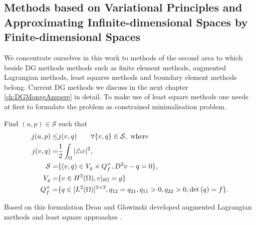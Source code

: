 \subsection{Methods based on Variational Principles and Approximating Infinite-dimensional Spaces by Finite-dimensional Spaces}
 We concentrate ourselves in this work to methods of the second area to which beside DG methods methods such as finite element methods, augmented Lagrangian methods, least squares methods and boundary element methods belong. Current DG methods we discuss in the next chapter \ref{ch:DGMongeAmpere} in detail.
To make use of least square methods one needs at first to formulate the \MA problem as constrained minimalisation problem.
\begin{definition}
Find $(u,p) \in \mathcal{S}$ such that
\begin{align}
	j(u,p) \leq& j(v,q) \qquad \forall \{v,q\} \in \mathcal{S}, \text{ where }\\
	j(v,q)  =& \frac 1 2 \int_{\Omega} |\triangle v |^2, \\
	\mathcal{S} =& \{(v,q)\in V_g \times Q^+_f, D^2v-q =0\},\\
	V_g =& \{v \in H^2(\Omega), v \arrowvert_{\delta \Omega}=g\} \\
	Q^+_f =& \{q \in [L^2(\Omega)]^{2\times2} , q_{12} =q_{21},  q_{11} > 0,q_{22} > 0, \det{\left(q\right)} = f\}.
\end{align}

\end{definition}
Based on this formulation Dean and Glowinski developed augmented Lagrangian methods and least square approaches \cite{DG2004,DG2006,DG2006a}.

